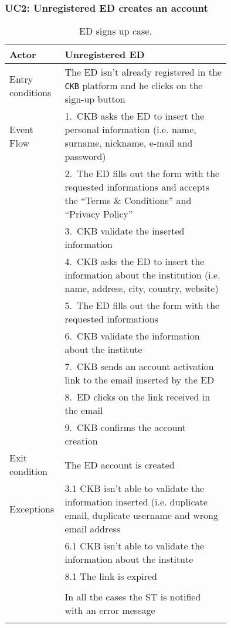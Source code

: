 \subsubsection*{UC2: Unregistered ED creates an account}
\begin{center}
  \begin{longtable}{l|p{0.75\linewidth}}
    \hline
    Actor & Unregistered ED \\
    \hline
    Entry conditions & The ED isn’t already registered in the \verb|CKB| platform and he clicks on the sign-up button \\
    \hline
    Event Flow & 1.\ CKB asks the ED to insert the personal information (i.e. name, surname, nickname, e-mail and password) \\
    & 2.\ The ED fills out the form with the requested informations and accepts the “Terms \& Conditions” and “Privacy Policy” \\
    & 3.\ CKB validate the inserted information \\
    & 4.\ CKB asks the ED to insert the information about the institution (i.e. name, address, city, country, website) \\
    & 5.\ The ED fills out the form with the requested informations \\
    & 6.\ CKB validate the information about the institute \\
    & 7.\ CKB sends an account activation link to the email inserted by the ED \\
    & 8.\ ED clicks on the link received in the email \\
    & 9.\ CKB confirms the account creation  \\
    \hline
    Exit condition & The ED account is created \\
    \hline
    Exceptions & 3.1 CKB isn’t able to validate the information inserted (i.e. duplicate email, duplicate username and wrong email address \\
    & 6.1 CKB isn’t able to validate the information about the institute \\
    & 8.1 The link is expired \\ \\
    & In all the cases the ST is notified with an error message\\
    \hline
    \caption{ED signs up case.}
    \label{tab: ED_signs_up}
  \end{longtable}
\end{center}

